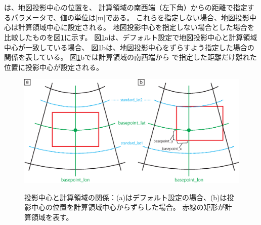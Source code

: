 {\small {\gt
{}}}\\~\\

\noindent
{}は、地図投影中心の位置を、
計算領域の南西端（左下角）からの距離で指定するパラメータで、値の単位は[m]である。
これらを指定しない場合、地図投影中心は計算領域中心に設定される。
地図投影中心を指定しない場合とした場合を比較したものを図\ref{fig:map_lc}に示す。
図\ref{fig:map_lc}aは、デフォルト設定で地図投影中心と計算領域中心が一致している場合、
図\ref{fig:map_lc}bは、地図投影中心をずらすよう指定した場合の関係を表している。
図\ref{fig:map_lc}bでは計算領域の南西端から
で指定した距離だけ離れた位置に投影中心が設定される。

\begin{figure}[t]
\begin{center}
  \includegraphics[width=0.8\hsize]{./figure/LC_latlon_xy.eps}\\
  \caption{投影中心と計算領域の関係：(a)はデフォルト設定の場合、(b)は投影中心の位置を計算領域中心からずらした場合。
  赤線の矩形が計算領域を表す。}
  \label{fig:map_lc}
\end{center}
\end{figure}
